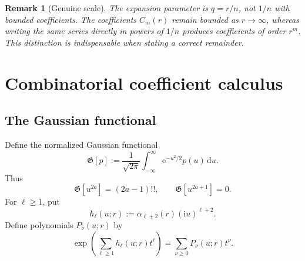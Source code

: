 \documentclass[11pt,a4paper]{article}
\newtheorem{remark}[theorem]{Remark}
\theoremstyle{definition}
\newcommand{\ee}{\mathrm e}
\newcommand{\ii}{\mathrm i}
\newcommand{\dd}{\,\mathrm d}
\newcommand{\Gaus}{\mathfrak G}
\begin{document}
\begin{remark}[Genuine scale]\label{rem:genuine-scale}
The expansion parameter is $q=r/n$, not $1/n$ with bounded coefficients.  The
coefficients $C_m(r)$ remain bounded as $r\to\infty$, whereas writing the same
series directly in powers of $1/n$ produces coefficients of order $r^m$.
This distinction is indispensable when stating a correct remainder.
\end{remark}

\section{Combinatorial coefficient calculus}

\subsection{The Gaussian functional}

Define the normalized Gaussian functional
\begin{equation}\label{eq:gaussian-functional}
 \Gaus[p]:=\frac1{\sqrt{2\pi}}
 \int_{-\infty}^{\infty}\ee^{-u^2/2}p(u)\dd u.
\end{equation}
Thus
\begin{equation}\label{eq:gaussian-moments}
 \Gaus[u^{2a}]=(2a-1)!!,
 \qquad \Gaus[u^{2a+1}]=0.
\end{equation}
For $\ell\ge1$, put
\begin{equation}\label{eq:h-def}
 h_\ell(u;r):=
 \alpha_{\ell+2}(r)(\ii u)^{\ell+2}.
\end{equation}
Define polynomials $P_\nu(u;r)$ by
\begin{equation}\label{eq:P-generating}
 \exp\!\left(\sum_{\ell\ge1}h_\ell(u;r)t^\ell\right)
 =\sum_{\nu\ge0}P_\nu(u;r)t^\nu.
\end{equation}
\end{document}
